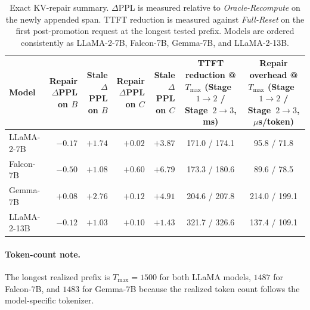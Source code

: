 \begin{table}[t]
\centering
\small
\setlength{\tabcolsep}{4pt}
\renewcommand{\arraystretch}{0.95}
\caption{
Exact KV-repair summary. \(\Delta\)PPL is measured relative to \textit{Oracle-Recompute} on the newly appended span. TTFT reduction is measured against \textit{Full-Reset} on the first post-promotion request at the longest tested prefix. Models are ordered consistently as LLaMA-2-7B, Falcon-7B, Gemma-7B, and LLaMA-2-13B.
}
\label{tab:kv-repair-summary-appendix}
\begin{tabular}{lrrrrcc}
\toprule
Model
& \makecell{Repair\\\(\Delta\)PPL on \(B\)}
& \makecell{Stale\\\(\Delta\)PPL on \(B\)}
& \makecell{Repair\\\(\Delta\)PPL on \(C\)}
& \makecell{Stale\\\(\Delta\)PPL on \(C\)}
& \makecell{TTFT reduction @ \(T_{\max}\)\\(Stage~\(1\!\rightarrow\!2\) / Stage~\(2\!\rightarrow\!3\), ms)}
& \makecell{Repair overhead @ \(T_{\max}\)\\(Stage~\(1\!\rightarrow\!2\) / Stage~\(2\!\rightarrow\!3\), \(\mu\)s/token)} \\
\midrule
LLaMA-2-7B
& \(-0.17\)
& \(+1.74\)
& \(+0.02\)
& \(+3.87\)
& 171.0 / 174.1
& 95.8 / 71.8 \\
Falcon-7B
& \(-0.50\)
& \(+1.08\)
& \(+0.60\)
& \(+6.79\)
& 173.3 / 180.6
& 89.6 / 78.5 \\
Gemma-7B
& \(+0.08\)
& \(+2.76\)
& \(+0.12\)
& \(+4.91\)
& 204.6 / 207.8
& 214.0 / 199.1 \\
LLaMA-2-13B
& \(-0.12\)
& \(+1.03\)
& \(+0.10\)
& \(+1.43\)
& 321.7 / 326.6
& 137.4 / 109.1 \\
\bottomrule
\end{tabular}
\end{table}

\paragraph{Token-count note.}
The longest realized prefix is \(T_{\max}{=}1500\) for both LLaMA models, \(1487\) for Falcon-7B, and \(1483\) for Gemma-7B because the realized token count follows the model-specific tokenizer.
